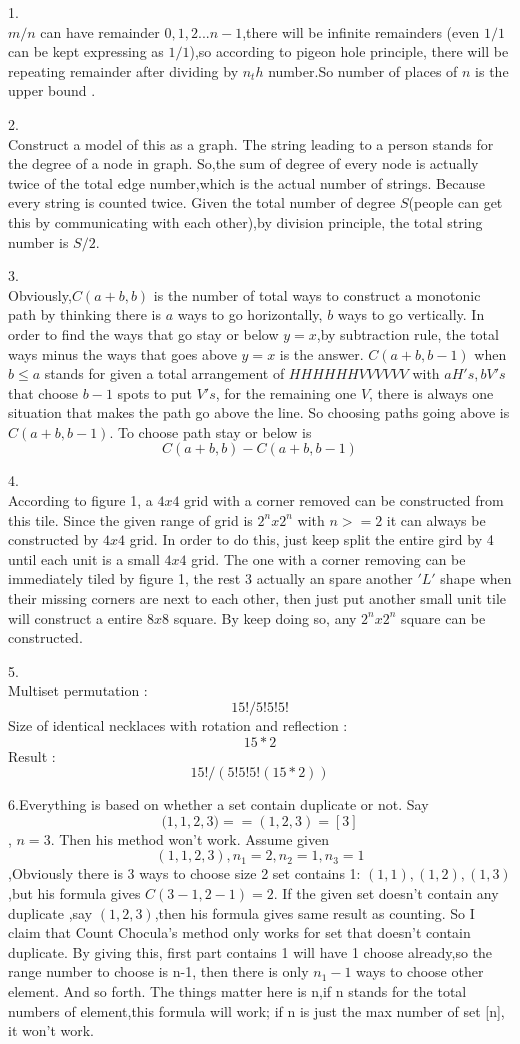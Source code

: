 \documentclass{article}
\begin{document}
1.\\$m/n$ can have remainder $0,1,2...n-1$,there will be infinite remainders (even $1/1$ can be kept expressing as $1/1$),so according to pigeon hole principle, there will be repeating remainder after dividing by $n_th$ number.So number of places of $n$ is the upper bound . 

2.\\Construct a model of this as a graph. The string leading to a person stands for the degree of a node in graph. So,the sum of
degree of every node is actually twice of the total edge number,which is the actual number of strings. Because every string is counted twice. Given the total number of degree $S$(people can get this by communicating with each other),by division principle, the total string number is $S/2$.

3.\\Obviously,$C(a+b,b)$ is the number of total ways to construct a monotonic path by thinking there is $a$ ways to go horizontally, $b$ ways to go vertically. In order to find the ways that go stay or below $y=x$,by subtraction rule, the total ways minus the ways that goes above $y=x$ is the answer.
$C(a+b,b-1)$ when $b \leq a$ stands for given a total arrangement of $HHHHHHVVVVVV$ with $a H's, b V's$ that choose $b-1$ spots to put $V's$, for the remaining one $V$, there is always one situation that makes the path go above the line. So choosing paths going above is $C(a+b,b-1)$. To choose path stay or below is $$C(a+b,b) - C(a+b,b-1)$$ 

4. \\According to figure 1, a $4x4$ grid with a corner removed can be constructed from this tile. Since the given range of grid is $2^n x 2^n$ with $n>=2$ it can always be constructed by $4x4$ grid. In order to do this, just keep split the entire gird by 4 until each unit is a small $4x4$ grid. The one with a corner removing can be immediately tiled by figure 1, the rest 3 actually an spare another $'L'$ shape when their missing corners are next to each other, then just put another small unit tile will construct a entire $8 x 8$ square. By keep doing so, any $2^n x 2^n$ square can be constructed.

5. \\Multiset permutation : $$15!/5!5!5!$$
Size of identical necklaces with rotation and reflection : $$15 * 2$$
Result : $$15!/(5!5!5!(15*2))$$

6.Everything is based on whether a set contain duplicate or not. Say $${(1,1,2,3}) == ({1,2,3}) = [3]$$, $n = 3$. Then his method won't work. Assume given $$(1,1,2,3) , n_1 = 2,n_2 = 1,n_3 = 1$$,Obviously there is $3$ ways to choose size 2 set contains 1: $(1,1),(1,2),(1,3)$,but his formula gives $C(3-1,2-1) = 2$. If the given set doesn't contain any duplicate ,say $(1,2,3)$,then his formula gives same result as counting. So I claim that Count Chocula's method only works for set that doesn't contain duplicate. By giving this, first part contains 1 will have 1 choose already,so the range number to choose is n-1, then there is only $n_1-1$ ways to choose other element. And so forth. The things matter here is n,if n stands for the total numbers of element,this formula will work; if n is just the max number of set [n], it won't work.
	 
\end{document}
